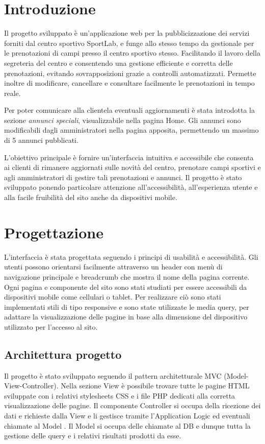 \documentclass{article}
\begin{document}
\flushleft

\section{Introduzione}

Il progetto sviluppato è un'applicazione web per la pubblicizzazione dei servizi forniti dal centro sportivo SportLab, e funge allo stesso tempo da gestionale per le prenotazioni di campi presso il centro sportivo stesso. Facilitando il lavoro della segreteria del centro e consentendo una gestione efficiente e corretta delle prenotazioni, evitando sovrapposizioni grazie a controlli automatizzati. Permette inoltre di modificare, cancellare e consultare facilmente le prenotazioni in tempo reale. 

Per poter comunicare alla clientela eventuali aggiornamenti è stata introdotta la sezione \textit{annunci speciali}, visualizzabile nella pagina Home. Gli annunci sono modificabili dagli amministratori nella pagina apposita, permettendo un massimo di 5 annunci pubblicati.

L'obiettivo principale è fornire un'interfaccia intuitiva e accessibile che consenta ai clienti di rimanere aggiornati sulle novità del centro, prenotare campi sportivi e agli amministratori di gestire tali prenotazioni e annunci.
Il progetto è stato sviluppato ponendo particolare attenzione all'accessibilità, all'esperienza utente e alla facile fruibilità del sito anche da dispositivi mobile.

\section{Progettazione}

L'interfaccia è stata progettata seguendo i principi di usabilità e accessibilità. Gli utenti possono orientarsi facilmente attraverso un header con menù di navigazione principale e breadcrumb che mostra il nome della pagina corrente. Ogni pagina e componente del sito sono stati studiati per essere accessibili da dispositivi mobile come cellulari o tablet. Per realizzare ciò sono stati implementati stili di tipo responsive e sono state utilizzate le media query, per adattare la visualizzazione delle pagine in base alla dimensione del dispositivo utilizzato per l'accesso al sito.

\subsection{Architettura progetto}
Il progetto è stato sviluppato seguendo il pattern architetturale MVC (Model-View-Controller). Nella sezione View è possibile trovare tutte le pagine HTML sviluppate con i relativi stylesheets CSS e i file PHP dedicati alla corretta visualizzazione delle pagine. Il componente Controller si occupa della ricezione dei dati e richieste dalla View e li gestisce tramite l'Application Logic ed eventuali chiamate al Model . Il Model si occupa delle chiamate al DB e dunque tutta la gestione delle query e i relativi risultati prodotti da esse.
\end{document}
